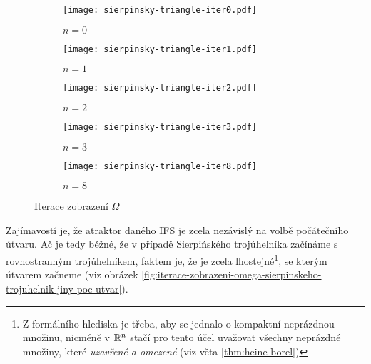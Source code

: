\begin{figure}[h]
    \centering
    \begin{subfigure}{0.45\textwidth}
        \centering
        \texttt{[image: sierpinsky-triangle-iter0.pdf]}
        \begin{center}
            $n=0$
        \end{center}
    \end{subfigure}
    \qquad
    \vspace{1cm}
    \begin{subfigure}{0.45\textwidth}
        \centering
        \texttt{[image: sierpinsky-triangle-iter1.pdf]}
        \begin{center}
            $n=1$
        \end{center}
    \end{subfigure}
    \qquad
    \begin{subfigure}{0.45\textwidth}
        \centering
        \texttt{[image: sierpinsky-triangle-iter2.pdf]}
        \begin{center}
            $n=2$
        \end{center}
    \end{subfigure}
    \qquad
    \vspace{1cm}
    \begin{subfigure}{0.45\textwidth}
        \centering
        \texttt{[image: sierpinsky-triangle-iter3.pdf]}
        \begin{center}
            $n=3$
        \end{center}
    \end{subfigure}
    \qquad
    \begin{subfigure}{0.45\textwidth}
        \centering
        \texttt{[image: sierpinsky-triangle-iter8.pdf]}
        \begin{center}
            $n=8$
        \end{center}
    \end{subfigure}
    \caption{Iterace zobrazení $\Omega$}
    \label{fig:iterace-zobrazeni-omega-sierpinskeho-trojuhelnik}
\end{figure}
Zajímavostí je, že atraktor daného IFS je zcela nezávislý na volbě počátečního útvaru. Ač je tedy běžné, že v případě Sierpińského trojúhelníka začínáme s rovnostranným trojúhelníkem, faktem je, že je zcela lhostejné\footnote{Z formálního hlediska je třeba, aby se jednalo o kompaktní neprázdnou množinu, nicméně v $\mathbb{R}^n$ stačí pro tento účel uvažovat všechny neprázdné množiny, které \emph{uzavřené a omezené} (viz věta \ref{thm:heine-borel})}, se kterým útvarem začneme (viz obrázek \ref{fig:iterace-zobrazeni-omega-sierpinskeho-trojuhelnik-jiny-poc-utvar}).
